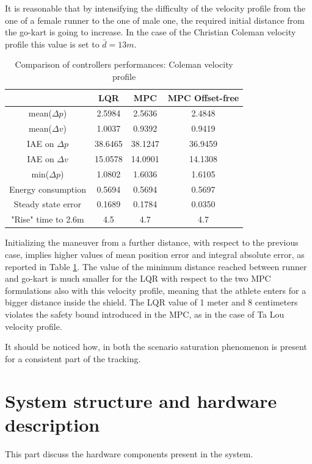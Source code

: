\documentclass[a4paper,12pt,oneside]{book}
\begin{document}
It is reasonable that by intensifying the difficulty of the velocity profile from the one of a female runner to the one of male one, the required initial distance from the go-kart is going to increase.
In the case of the Christian Coleman velocity profile this value is set to $\bar{d} = 13m$.

\begin{table}[h!]
	\centering
	\begin{tabular}{c|c|c|c}
          & LQR & MPC & MPC Offset-free \\
	\hline
	\hline
	mean($\Delta p$) & 2.5984 & 2.5636 &  2.4848 \\
	mean($\Delta v$) & 1.0037 & 0.9392 & 0.9419 \\
	IAE on $\Delta p$ & 38.6465 & 38.1247 & 36.9459 \\
	IAE on $\Delta v$ & 15.0578 & 14.0901 & 14.1308 \\
	min($\Delta p$) & 1.0802 & 1.6036 & 1.6105 \\
	Energy consumption & 0.5694 & 0.5694 & 0.5697 \\
	Steady state error & 0.1689 & 0.1784 & 0.0350 \\
	"Rise" time to 2.6m & 4.5 & 4.7 & 4.7 \\
	\hline
	\end{tabular}
\caption{Comparison of controllers performances: Coleman velocity profile}
\label{tab:Coleman}
\end{table}

Initializing the maneuver from a further distance, with respect to the previous case, implies higher values of mean position error and integral absolute error, as reported in Table \ref{tab:Coleman}.
The value of the minimum distance reached between runner and go-kart is much smaller for the LQR with respect to the two MPC formulations also with this velocity profile, meaning that the athlete enters for a bigger distance inside the shield.
The LQR value of 1 meter and 8 centimeters violates the safety bound introduced in the MPC, as in the case of Ta Lou velocity profile.

It should be noticed how, in both the scenario saturation phenomenon is present for a consistent part of the tracking.


\section{System structure and hardware description}
This part discuss the hardware components present in the system.
\end{document}
